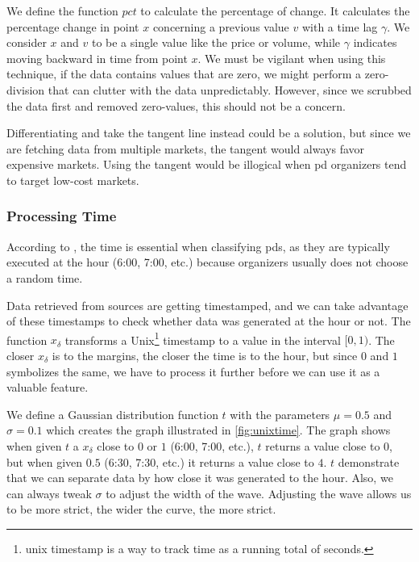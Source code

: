 We define the function $pct$ to calculate the percentage of change. It calculates the percentage change in point $x$ concerning a previous value $v$ with a time lag $\gamma$. We consider $x$ and $v$ to be a single value like the price or volume, while $\gamma$ indicates moving backward in time from point $x$. We must be vigilant when using this technique, if the data contains values that are zero, we might perform a zero-division that can clutter with the data unpredictably. However, since we scrubbed the data first and removed zero-values, this should not be a concern.



Differentiating and take the tangent line instead could be a solution, but since we are fetching data from multiple markets, the tangent would always favor expensive markets. Using the tangent would be illogical when \ac{pd} organizers tend to target low-cost markets.

\subsubsection{Processing Time}
According to \cite{P&D_anatomy}, the time is essential when classifying \acp{pd}, as they are typically executed at the hour (6:00, 7:00, etc.) because organizers usually does not choose a random time.



Data retrieved from sources are getting timestamped, and we can take advantage of these timestamps to check whether data was generated at the hour or not. The function $x_\delta$ transforms a Unix\footnote{unix timestamp is a way to track time as a running total of seconds.} timestamp to a value in the interval $[0, 1)$. The closer $x_\delta$ is to the margins, the closer the time is to the hour, but since $0$ and $1$ symbolizes the same, we have to process it further before we can use it as a valuable feature.

We define a Gaussian distribution function $t$ with the parameters $\mu=0.5$ and $\sigma=0.1$ which creates the graph illustrated in \autoref{fig:unixtime}. The graph shows when given $t$ a $x_\delta$ close to $0$ or $1$ (6:00, 7:00, etc.), $t$ returns a value close to $0$, but when given $0.5$ (6:30, 7:30, etc.) it returns a value close to $4$. $t$ demonstrate that we can separate data by how close it was generated to the hour. Also, we can always tweak $\sigma$ to adjust the width of the wave. Adjusting the wave allows us to be more strict, the wider the curve, the more strict.

